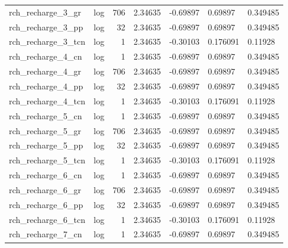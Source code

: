 \documentclass{article}
\begin{document}
\begin{center}
\begin{landscape}
\begin{longtable}{llrllll}
  rch\_recharge\_3\_gr &       log &    706 &        2.34635 &            -0.69897 &            0.69897 &           0.349485 \\
  rch\_recharge\_3\_pp &       log &     32 &        2.34635 &            -0.69897 &            0.69897 &           0.349485 \\
 rch\_recharge\_3\_tcn &       log &      1 &        2.34635 &            -0.30103 &           0.176091 &            0.11928 \\
  rch\_recharge\_4\_cn &       log &      1 &        2.34635 &            -0.69897 &            0.69897 &           0.349485 \\
  rch\_recharge\_4\_gr &       log &    706 &        2.34635 &            -0.69897 &            0.69897 &           0.349485 \\
  rch\_recharge\_4\_pp &       log &     32 &        2.34635 &            -0.69897 &            0.69897 &           0.349485 \\
 rch\_recharge\_4\_tcn &       log &      1 &        2.34635 &            -0.30103 &           0.176091 &            0.11928 \\
  rch\_recharge\_5\_cn &       log &      1 &        2.34635 &            -0.69897 &            0.69897 &           0.349485 \\
  rch\_recharge\_5\_gr &       log &    706 &        2.34635 &            -0.69897 &            0.69897 &           0.349485 \\
  rch\_recharge\_5\_pp &       log &     32 &        2.34635 &            -0.69897 &            0.69897 &           0.349485 \\
 rch\_recharge\_5\_tcn &       log &      1 &        2.34635 &            -0.30103 &           0.176091 &            0.11928 \\
  rch\_recharge\_6\_cn &       log &      1 &        2.34635 &            -0.69897 &            0.69897 &           0.349485 \\
  rch\_recharge\_6\_gr &       log &    706 &        2.34635 &            -0.69897 &            0.69897 &           0.349485 \\
  rch\_recharge\_6\_pp &       log &     32 &        2.34635 &            -0.69897 &            0.69897 &           0.349485 \\
 rch\_recharge\_6\_tcn &       log &      1 &        2.34635 &            -0.30103 &           0.176091 &            0.11928 \\
  rch\_recharge\_7\_cn &       log &      1 &        2.34635 &            -0.69897 &            0.69897 &           0.349485 \\

\end{longtable}
\end{landscape}
\end{center}
\end{document}
